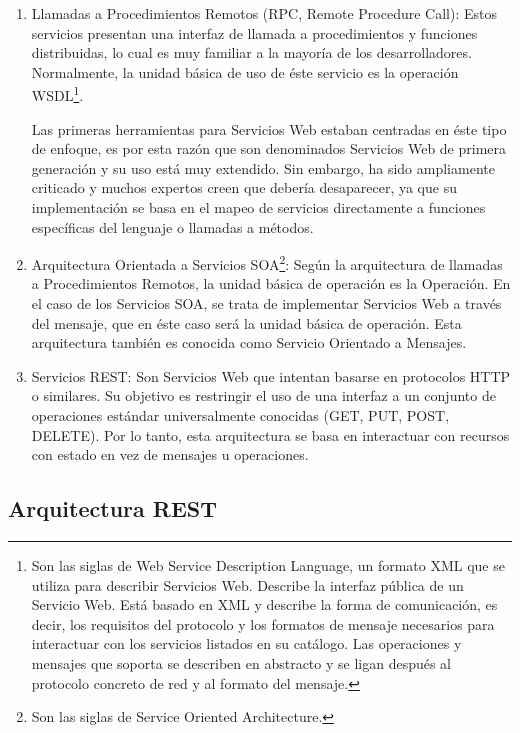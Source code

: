 \begin{enumerate}
\item Llamadas a Procedimientos Remotos (RPC, Remote Procedure Call): Estos servicios presentan una interfaz de llamada a procedimientos y funciones distribuidas, lo cual es muy familiar a la mayoría de los desarrolladores. Normalmente, la unidad básica de uso de éste servicio es la operación WSDL\footnote[5]{Son las siglas de Web Service Description Language, un formato XML que se utiliza para describir Servicios Web. Describe la interfaz pública de un Servicio Web. Está basado en XML y describe la forma de comunicación, es decir, los requisitos del protocolo y los formatos de mensaje necesarios para interactuar con los servicios listados en su catálogo. Las operaciones y mensajes que soporta se describen en abstracto y se ligan después al protocolo concreto de red y al formato del mensaje.}.
\bigskip
\par
Las primeras herramientas para Servicios Web estaban centradas en éste tipo de enfoque, es por esta razón que son denominados Servicios Web de primera generación y su uso está muy extendido. Sin embargo, ha sido ampliamente criticado y muchos expertos creen que debería desaparecer, ya que su implementación se basa en el mapeo de servicios directamente a funciones específicas del lenguaje o llamadas a métodos.
\item Arquitectura Orientada a Servicios SOA\footnote[6]{Son las siglas de Service Oriented Architecture.}: Según la arquitectura de llamadas a Procedimientos Remotos, la unidad básica de operación es la Operación. En el caso de los Servicios SOA, se trata de implementar Servicios Web a través del mensaje, que en éste caso será la unidad básica de operación. Esta arquitectura también es conocida como Servicio Orientado a Mensajes.
\item Servicios REST: Son Servicios Web que intentan basarse en protocolos HTTP o similares. Su objetivo es restringir el uso de una interfaz a un conjunto de operaciones estándar universalmente conocidas (GET, PUT, POST, DELETE). Por lo tanto, esta arquitectura se basa en interactuar con recursos con estado en vez de mensajes u operaciones. 
\end{enumerate}
\subsection{Arquitectura REST}

